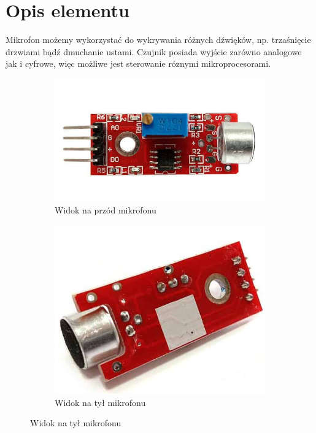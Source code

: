 \documentclass[11pt, a4paper]{article}
\author{Dawid Włodarczyk}
\begin{document}
%
%
\newpage

\section*{Opis elementu}
Mikrofon możemy wykorzystać do wykrywania różnych dźwięków, np. trzaśnięcie drzwiami bądź dmuchanie ustami. Czujnik posiada wyjście zarówno analogowe jak i cyfrowe, więc możliwe jest sterowanie róznymi mikroprocesorami. 
\vspace{0.25cm}
\begin{figure}[h]
\centering
\begin{subfigure}{.5\textwidth}
\centering
\includegraphics[width=.7\linewidth]{fig/KY-037/zasada_dzialania/front_mikro.png}
\caption{Widok na przód mikrofonu \cite{przod}}
\label{fig:_zdjecie_elementu}
\end{subfigure}%
\begin{subfigure}{.5\textwidth}
\centering
\includegraphics[width=.6\linewidth]{fig/KY-037/zasada_dzialania/tyl_mikro.png}
\caption{Widok na tył mikrofonu \cite{tyl}}
\label{fig:_zasada_dzialania_elementu}
\end{subfigure}
\label{fig:element}
\end{figure}
\vspace{0.25cm}
\end{document}
